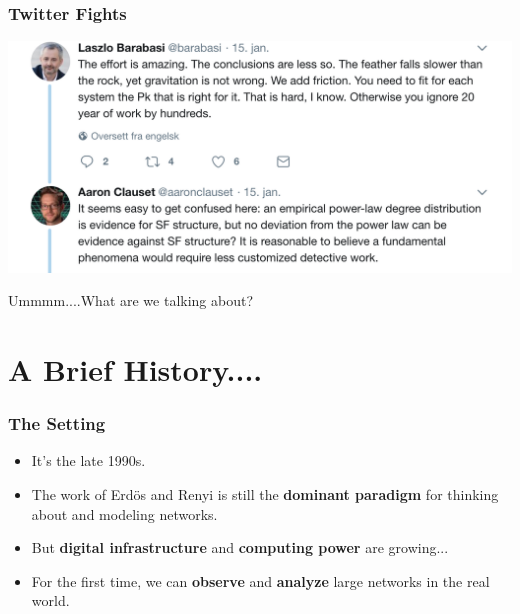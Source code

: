 \documentclass{beamer}
\begin{document}
		
		\begin{frame}\frametitle{Twitter Fights}
		  	\includegraphics[width=\textwidth]{twitter}
		\end{frame}

		
		\begin{frame}[standout]
		  	Ummmm....What are we talking about?
		\end{frame}

\section{A Brief History....}
		
		\begin{frame}\frametitle{The Setting}
		  	\begin{itemize}
		  		\pause \item It's the late 1990s. 
		  		\pause \item The work of Erd\"{o}s and Renyi is still the \textbf{dominant paradigm} for thinking about and modeling networks. 
		  		\pause \item But \textbf{digital infrastructure} and \textbf{computing power} are growing...
		  		\pause \item For the first time, we can \textbf{observe} and \textbf{analyze} large networks in the real world. 
		  	\end{itemize}
		\end{frame}
		
\end{document}
